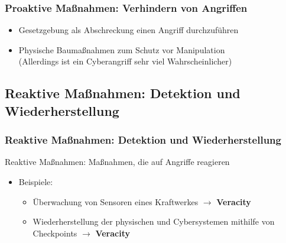 \documentclass{sikslides}
\begin{document}
    \begin{frame}
        \frametitle{Proaktive Maßnahmen: Verhindern von Angriffen}
        \begin{itemize}[<+->]
            \item Gesetzgebung als Abschreckung einen Angriff durchzuführen
            \item Physische Baumaßnahmen zum Schutz vor Manipulation\\(Allerdings ist ein Cyberangriff sehr viel Wahrscheinlicher)
        \end{itemize}
    \end{frame}

    \subsection{Reaktive Maßnahmen: Detektion und Wiederherstellung}
    \begin{frame}
        \frametitle{Reaktive Maßnahmen: Detektion und Wiederherstellung}
        \begin{block}{}
            Reaktive Maßnahmen: Maßnahmen, die auf Angriffe reagieren
        \end{block}
        \begin{itemize}
            \item Beispiele:
            \begin{itemize}
                \item Überwachung von Sensoren eines Kraftwerkes $\rightarrow$ \textbf{Veracity}
                \item Wiederherstellung der physischen und Cybersystemen mithilfe von Checkpoints $\rightarrow$ \textbf{Veracity}
            \end{itemize}
        \end{itemize}
    \end{frame}
\end{document}
